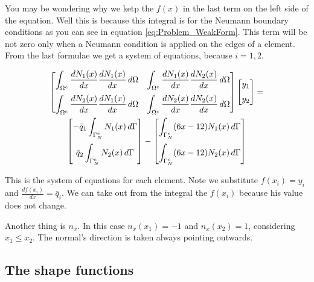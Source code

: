 \documentclass[letterpaper,10pt]{article}
\begin{document}
You may be wondering why we ketp the $f(x)$ in the last term on the left side of the equation. Well this is because this integral is for the Neumann boundary conditions as you can see in equation \ref{eq:Problem_WeakForm}. This term will be not zero only when a Neumann condition is applied on the edges of a element. From the last formulae we get a system of equations, because $i=1,2$.

\begin{multline}
\begin{bmatrix}
\displaystyle
\int_{\Omega^e} \frac{d N_1(x)}{d x} \frac{d N_1(x)}{d x} \, d\Omega &
\displaystyle
\int_{\Omega^e} \frac{d N_1(x)}{d x} \frac{d N_2(x)}{d x} \, d\Omega \vspace{2mm} \\
\displaystyle
\int_{\Omega^e} \frac{d N_2(x)}{d x} \frac{d N_1(x)}{d x} \, d\Omega &
\displaystyle
\int_{\Omega^e} \frac{d N_2(x)}{d x} \frac{d N_2(x)}{d x} \, d\Omega
\end{bmatrix}
\begin{bmatrix}
y_1 \vspace{2mm}\\
y_2
\end{bmatrix}
= \\
\begin{bmatrix}
\displaystyle
-\bar{q}_1 \int_{\Gamma_N^e} N_1(x) \, d\Gamma \vspace{2mm}\\
\displaystyle
\bar{q}_2 \int_{\Gamma_N^e} N_2(x) \, d\Gamma
\end{bmatrix}
-
\begin{bmatrix}
\displaystyle
\int_{\Gamma_N^e} (6x-12) N_1(x) \, d\Gamma \vspace{2mm}\\
\displaystyle
\int_{\Gamma_N^e} (6x-12) N_2(x) \, d\Gamma
\end{bmatrix}
\label{eq:SystemEq_Element}
\end{multline}

This is the system of equations for each element. Note we substitute $f(x_i) = y_i$ and $\frac{d f(x_i)}{d x} = \bar{q}_i$. We can take out from the integral the $f(x_i)$ because his value does not change.

Another thing is $n_x$. In this case $n_x(x_1) = -1$ and $n_x(x_2)=1$, considering $x_1 \leq x_2$. The normal's direction is taken always pointing outwards.

\subsection{The shape functions}
\end{document}
